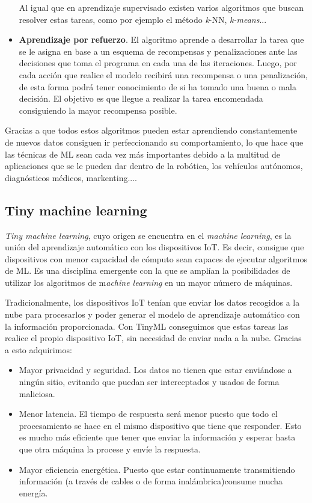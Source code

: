 \documentclass[a4paper, 12pt]{book}
\begin{document}
\begin{itemize}
    Al igual que en aprendizaje supervisado existen varios algoritmos que buscan resolver estas tareas, como por ejemplo el método \textit{k}-NN, \textit{k-means}...
    
    \item \textbf{Aprendizaje por refuerzo}. El algoritmo aprende a desarrollar la tarea que se le asigna en base a un esquema de recompensas y penalizaciones ante las decisiones que toma el programa en cada una de las iteraciones. Luego, por cada acción que realice el modelo recibirá una recompensa o una penalización, de esta forma podrá tener conocimiento de si ha tomado una buena o mala decisión. El objetivo es que llegue a realizar la tarea encomendada consiguiendo la mayor recompensa posible.
\end{itemize}

Gracias a que todos estos algoritmos pueden estar aprendiendo constantemente de nuevos datos consiguen ir perfeccionando su comportamiento, lo que hace que las técnicas de ML sean cada vez más importantes debido a la multitud de aplicaciones que se le pueden dar dentro de la robótica, los vehículos autónomos, diagnósticos médicos, markenting....

\subsection{Tiny machine learning}
\label{subsec:tinyML}

\textit{Tiny machine learning}\cite{Warden2020,TinyML}, cuyo origen se encuentra en el \textit{machine learning}, es la unión del aprendizaje automático con los dispositivos IoT. Es decir, consigue que dispositivos con menor capacidad de cómputo sean capaces de ejecutar algoritmos de ML. Es una disciplina emergente con la que se amplían la posibilidades de utilizar los algoritmos de m\textit{achine learning} en un mayor número de máquinas.

Tradicionalmente, los dispositivos IoT tenían que enviar los datos recogidos a la nube para procesarlos y poder generar el modelo de aprendizaje automático con la información proporcionada. Con TinyML conseguimos que estas tareas las realice el propio dispositivo IoT, sin necesidad de enviar nada a la nube. Gracias a esto adquirimos: 

\begin{itemize}
    \item Mayor privacidad y seguridad. Los datos no tienen que estar enviándose a ningún sitio, evitando que puedan ser interceptados y usados de forma maliciosa.
    \item Menor latencia. El tiempo de respuesta será menor puesto que todo el procesamiento se hace en el mismo dispositivo que tiene que responder. Esto es mucho más eficiente que tener que enviar la información y esperar hasta que otra máquina la procese y envíe la respuesta.
    \item Mayor eficiencia energética. Puesto que estar continuamente transmitiendo información (a través de cables o de forma inalámbrica)consume mucha energía.
\end{itemize}
\end{document}

